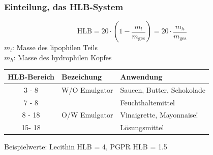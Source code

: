 \documentclass{beamer} %
\begin{document}
\begin{frame}
\frametitle{Einteilung, das HLB-System}
\begin{block}{}
\begin{equation*}
\text{HLB} = 20 \cdot \left(1-\frac{m_l}{m_{\text{ges}}}\right) = 20 \cdot \frac{m_h}{m_{\text{ges}}}
\end{equation*}
$m_l$: Masse des lipophilen Teils \\
$m_h$: Masse des hydrophilen Kopfes
\end{block}


\pause
\begin{table}[H]
   \centering
   \begin{tabular}{|c|l|l|}
   \hline
   HLB-Bereich & Bezeichung &  Anwendung  \\
   \hline
   3 - 8 & W/O Emulgator & Saucen, Butter, Schokolade \\
   7 - 8 & & Feuchthaltemittel \\
   8 - 18 & O/W Emulgator & Vinaigrette, Mayonnaise! \\
   15- 18 & & Lösungsmittel \\
   \hline   
   \end{tabular}
\end{table}%
\begin{block}{}
Beispielwerte: Lecithin HLB = 4, PGPR HLB = 1.5
\end{block}


\end{frame}
\end{document}
